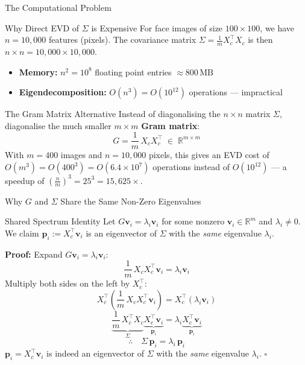 \documentclass{beamer}
\begin{document}
\begin{frame}[shrink=10]{The Computational Problem}
  \begin{block}{Why Direct EVD of $\Sigma$ is Expensive}
    For face images of size $100 \times 100$, we have $n = 10{,}000$
    features (pixels).
    The covariance matrix $\Sigma = \frac{1}{m}X_c^\top X_c$ is then
    $n \times n = 10{,}000 \times 10{,}000$.
    \begin{itemize}\setlength\itemsep{5pt}
      \item \textbf{Memory:} $n^2 = 10^8$ floating point entries
            $\approx 800\,\text{MB}$
      \item \textbf{Eigendecomposition:} $O(n^3) = O(10^{12})$
            operations --- impractical
    \end{itemize}
  \end{block}

  \medskip

  \begin{block}{The Gram Matrix Alternative}
    Instead of diagonalising the $n \times n$ matrix $\Sigma$,
    diagonalise the much smaller $m \times m$
    \textbf{Gram matrix}:
    \[
      G = \frac{1}{m}\,X_c X_c^\top \;\in\; \mathbb{R}^{m \times m}
    \]
    With $m = 400$ images and $n = 10{,}000$ pixels, this gives an EVD
    cost of $O(m^3) = O(400^3) = O(6.4 \times 10^7)$ operations instead
    of $O(10^{12})$ --- a speedup of
    $\left(\frac{n}{m}\right)^3 = 25^3 = 15{,}625\times$.
  \end{block}
\end{frame}

\begin{frame}[shrink=10]{Why $G$ and $\Sigma$ Share the Same Non-Zero Eigenvalues}
  \begin{block}{Shared Spectrum Identity}
    Let $G\mathbf{v}_i = \lambda_i\mathbf{v}_i$ for some nonzero
    $\mathbf{v}_i \in \mathbb{R}^m$ and $\lambda_i \neq 0$.
    We claim $\mathbf{p}_i := X_c^\top\mathbf{v}_i$ is an eigenvector
    of $\Sigma$ with the \emph{same} eigenvalue $\lambda_i$.

    \medskip

    \textbf{Proof:} Expand $G\mathbf{v}_i = \lambda_i\mathbf{v}_i$:
    \[
      \frac{1}{m}\,X_c X_c^\top\mathbf{v}_i = \lambda_i\mathbf{v}_i
    \]
    Multiply both sides on the left by $X_c^\top$:
    \[
      X_c^\top\!\left(\frac{1}{m}\,X_c X_c^\top\mathbf{v}_i\right)
        = X_c^\top(\lambda_i\mathbf{v}_i)
    \]
    \[
      \underbrace{\frac{1}{m}\,X_c^\top X_c}_{\Sigma}
        \underbrace{X_c^\top\mathbf{v}_i}_{\mathbf{p}_i}
        = \lambda_i \underbrace{X_c^\top\mathbf{v}_i}_{\mathbf{p}_i}
    \]
    \[
      \therefore\quad
      \boxed{\Sigma\,\mathbf{p}_i = \lambda_i\,\mathbf{p}_i}
    \]
    $\mathbf{p}_i = X_c^\top\mathbf{v}_i$ is indeed an eigenvector of
    $\Sigma$ with the \emph{same} eigenvalue $\lambda_i$.
    \hfill $\square$
  \end{block}
\end{frame}
\end{document}
